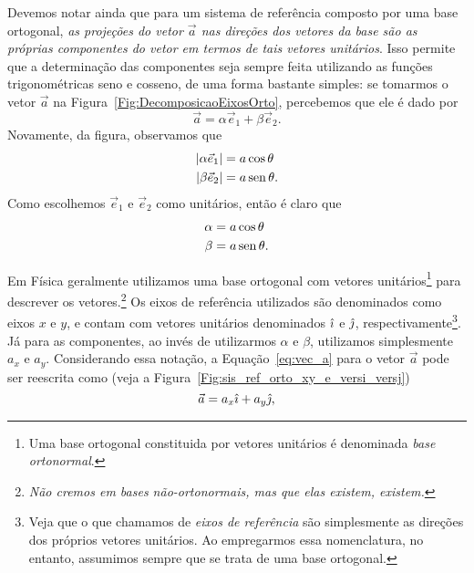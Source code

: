 Devemos notar ainda que para um sistema de referência composto por uma base ortogonal, \emph{as projeções do vetor $\vec{a}$ nas direções dos vetores da base são as próprias componentes do vetor em termos de tais vetores unitários}. Isso permite que a determinação das componentes seja sempre feita utilizando as funções trigonométricas seno e cosseno, de uma forma bastante simples: se tomarmos o vetor $\vec{a}$ na Figura~\ref{Fig:DecomposicaoEixosOrto}, percebemos que ele é dado por
\begin{equation}\label{eq:vec_a}
    \vec{a} = \alpha\vec{e}_1 + \beta\vec{e}_2.
\end{equation}
%
Novamente, da figura, observamos que
\begin{align}
    |\alpha\vec{e}_1| &= a\cos\theta \\
    |\beta\vec{e}_2| &= a\operatorname{sen}\theta.
\end{align}
%
Como escolhemos $\vec{e}_1$ e $\vec{e}_2$ como unitários, então é claro que
\begin{align}
    \alpha &= a\cos\theta \\
    \beta &= a\operatorname{sen}\theta.
\end{align}

Em Física geralmente utilizamos uma base ortogonal com vetores unitários\footnote[][-1cm]{Uma base ortogonal constituida por vetores unitários é denominada \emph{base ortonormal}.} para descrever os vetores.\footnote{\textit{Não cremos em bases não-ortonormais, mas que elas existem, existem.}} Os eixos de referência utilizados são denominados como eixos $x$ e $y$, e contam com vetores unitários denominados $\hat{\imath}$ e $\hat{\jmath}$, respectivamente\footnote{Veja que o que chamamos de \emph{eixos de referência} são simplesmente as direções dos próprios vetores unitários. Ao empregarmos essa nomenclatura, no entanto, assumimos sempre que se trata de uma base ortogonal.}. Já para as componentes, ao invés de utilizarmos $\alpha$ e $\beta$, utilizamos simplesmente $a_x$ e $a_y$. Considerando essa notação, a Equação~\eqref{eq:vec_a} para o vetor $\vec{a}$ pode ser reescrita como (veja a Figura~\ref{Fig:sis_ref_orto_xy_e_versi_versj})
\begin{equation}
    \vec{a} = a_x \hat{\imath} + a_y \hat{\jmath},
\end{equation}

